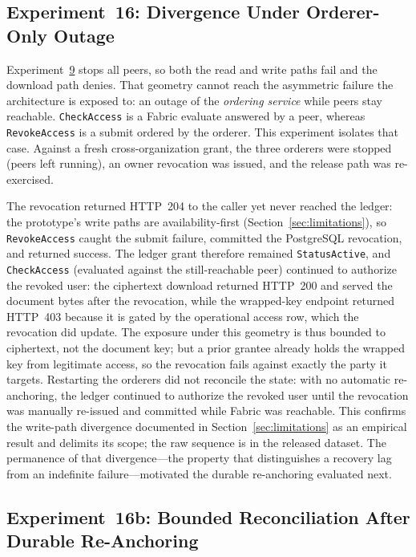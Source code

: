 \documentclass[preprint,12pt]{elsarticle}
\begin{document}
\subsection{Experiment~16: Divergence Under Orderer-Only Outage}
\label{sec:exp_orderer_outage}

Experiment~\hyperref[sec:exp_failclosed]{9} stops all peers, so both the
read and write paths fail and the download path denies. That geometry
cannot reach the asymmetric failure the architecture is exposed to: an
outage of the \emph{ordering service} while peers stay reachable.
\texttt{CheckAccess} is a Fabric evaluate answered by a peer, whereas
\texttt{RevokeAccess} is a submit ordered by the orderer. This experiment
isolates that case. Against a fresh cross-organization grant, the three
orderers were stopped (peers left running), an owner revocation was
issued, and the release path was re-exercised.

The revocation returned HTTP~204 to the caller yet never reached the
ledger: the prototype's write paths are availability-first
(Section~\ref{sec:limitations}), so \texttt{RevokeAccess} caught the
submit failure, committed the \mbox{PostgreSQL} revocation, and returned
success. The ledger grant therefore remained \texttt{StatusActive}, and
\texttt{CheckAccess} (evaluated against the still-reachable peer) continued
to authorize the revoked user: the ciphertext download returned HTTP~200
and served the document bytes after the revocation, while the wrapped-key
endpoint returned HTTP~403 because it is gated by the operational access
row, which the revocation did update. The exposure under this geometry is
thus bounded to ciphertext, not the document key; but a prior grantee
already holds the wrapped key from legitimate access, so the revocation
fails against exactly the party it targets. Restarting the orderers did not
reconcile the state: with no automatic re-anchoring, the ledger continued
to authorize the revoked user until the revocation was manually re-issued
and committed while Fabric was reachable. This confirms the write-path
divergence documented in Section~\ref{sec:limitations} as an empirical
result and delimits its scope; the raw sequence is in the released dataset.
The permanence of that divergence---the property that distinguishes a
recovery lag from an indefinite failure---motivated the durable
re-anchoring evaluated next.

\subsection{Experiment~16b: Bounded Reconciliation After Durable Re-Anchoring}
\label{sec:exp_orderer_reconcile}
\end{document}
